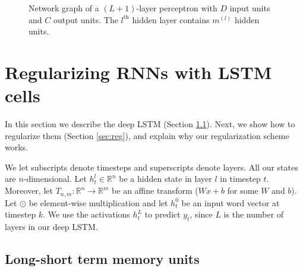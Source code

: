 \documentclass[twoside,11pt,a4paper]{article}
\begin{document}
\begin{figure}[t]
		\caption[ Wielowarstwowa sieć neuronowa, która zawiera $(L+1)$-wastw z $D$ wejściami oraz $C$ wyjściami 
		Network graph for a $(L+1)$-layer perceptron.]{Network graph of a $(L+1)$-layer perceptron with $D$ input units and $C$ output units. The $l^{\text{th}}$ hidden layer contains $m^{(l)}$ hidden units.}
		\label{fig:multilayer-perceptron}
	\end{figure}
	
		\section{Regularizing RNNs with LSTM cells}
	
	In this section we describe the deep LSTM (Section \ref{sec:lstm}). Next, 
	we show how to regularize them (Section \ref{sec:reg}), and explain
	why our regularization scheme works.
	
	We let subscripts denote timesteps and superscripts denote 
	layers.  All our states are $n$-dimensional.  Let $h^l_t
	\in \mathbb{R}^{n}$ be a hidden state in layer $l$ in timestep
	$t$. Moreover, let $T_{n,m}:\mathbb{R}^{n} \rightarrow \mathbb{R}^{m}$
	be an affine transform ($Wx + b$ for some $W$ and $b$).
	Let $\odot$ be element-wise multiplication and let $h^0_t$ be an
	input word vector at timestep $k$.  We use the activations $h^{L}_t$ to predict $y_t$,
	since $L$ is the number of layers in our deep LSTM.
	
	\subsection{Long-short term memory units}
	\label{sec:lstm}
	
\end{document}
